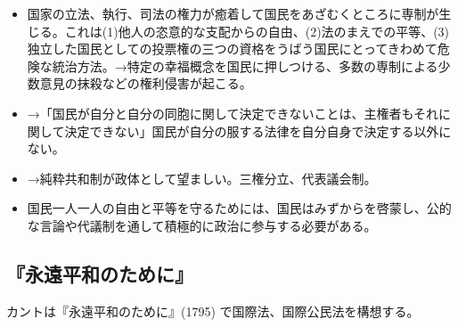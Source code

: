 \documentclass[uplatex,dvipdfmx]{jsarticle} \usepackage{mystyle}%
\begin{document}
\begin{itemize}


\item 国家の立法、執行、司法の権力が癒着して国民をあざむくところに専制が生じる。これは(1)他人の恣意的な支配からの自由、(2)法のまえでの平等、(3)独立した国民としての投票権の三つの資格をうばう国民にとってきわめて危険な統治方法。→特定の幸福概念を国民に押しつける、多数の専制による少数意見の抹殺などの権利侵害が起こる。

\item →「国民が自分と自分の同胞に関して決定できないことは、主権者もそれに関して決定できない」国民が自分の服する法律を自分自身で決定する以外にない。
 
\item →純粋共和制が政体として望ましい。三権分立、代表議会制。

\item 国民一人一人の自由と平等を守るためには、国民はみずからを啓蒙し、公的な言論や代議制を通して積極的に政治に参与する必要がある。
\end{itemize}

\subsection{『永遠平和のために』}

カントは『永遠平和のために』(1795) \citep{kant1795:_zum_ewigen_fried}で国際法、国際公民法を構想する。
\end{document}
